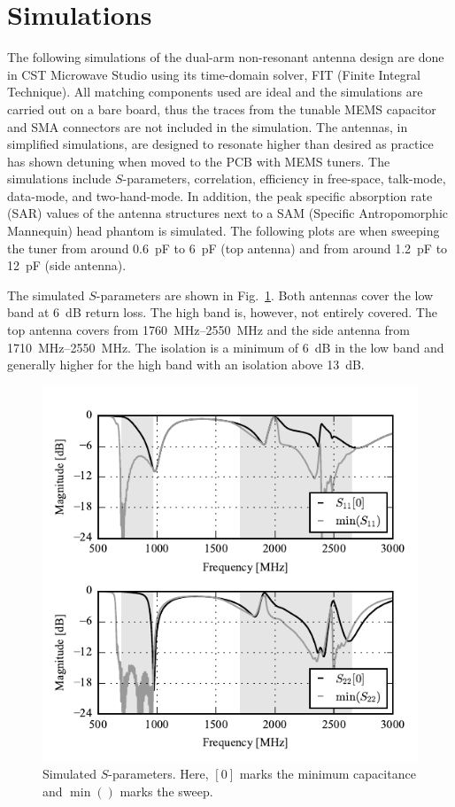 \section{Simulations}
\label{sec:simulations}
The following simulations of the dual-arm non-resonant antenna design are done in CST Microwave Studio using its time-domain solver, FIT (Finite Integral Technique). All matching components used are ideal and the simulations are carried out on a bare board, thus the traces from the tunable MEMS capacitor and SMA connectors are not included in the simulation. 
The antennas, in simplified simulations, are designed to resonate higher than desired as practice has shown detuning when moved to the PCB with MEMS tuners.
The simulations include $S$-parameters, correlation, efficiency in free-space, talk-mode, data-mode, and two-hand-mode. In addition, the peak specific absorption rate (SAR) values of the antenna structures next to a SAM (Specific Antropomorphic Mannequin) head phantom is simulated. The following plots are when sweeping the tuner from around \SI{0.6}{pF} to \SI{6}{pF} (top antenna) and from around \SI{1.2}{pF} to \SI{12}{pF} (side antenna).


The simulated $S$-parameters are shown in Fig.~\ref{fig:sim_sparams}. Both antennas cover the low band at \SI{6}{dB} return loss. The high band is, however, not entirely covered. The top antenna covers from \SIrange{1760}{2550}{MHz} and the side antenna from \SIrange{1710}{2550}{MHz}. The isolation is a minimum of \SI{6}{dB} in the low band and generally higher for the high band with an isolation above \SI{13}{dB}. 
\begin{figure}[tb]
    \centering
    \includegraphics{img/sim/sparams/sparams}
    \caption{Simulated $S$-parameters. Here, $[0]$ marks the minimum capacitance and $\min()$ marks the sweep.}
    \label{fig:sim_sparams}
\end{figure}


